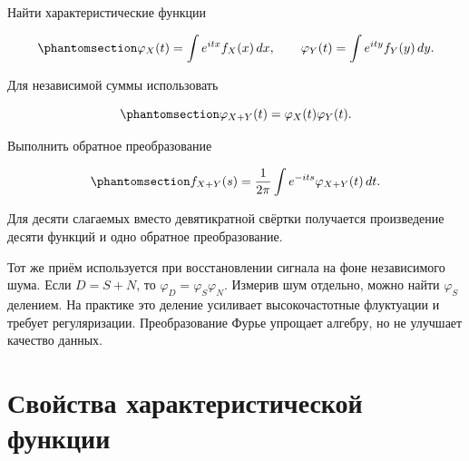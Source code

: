 \documentclass[
  russian,
  11pt,
  a4paper,
  open=any]{scrbook}
\begin{document}
Найти характеристические функции

\begin{equation}\protect\phantomsection\label{eq-sum-fourier-step-forward}{
\varphi_X(t)=\int e^{itx}f_X(x)\,dx,
\qquad
\varphi_Y(t)=\int e^{ity}f_Y(y)\,dy.
}\end{equation}

\par\medskip{}\hspace{0.8em}{\sffamily\bfseries Перемножить}\par\nobreak\smallskip

Для независимой суммы использовать

\begin{equation}\protect\phantomsection\label{eq-sum-fourier-step-product}{
\varphi_{X+Y}(t)=\varphi_X(t)\varphi_Y(t).
}\end{equation}

\par\medskip{}\hspace{0.8em}{\sffamily\bfseries Вернуться к плотности}\par\nobreak\smallskip

Выполнить обратное преобразование

\begin{equation}\protect\phantomsection\label{eq-sum-fourier-step-inverse}{
f_{X+Y}(s)=
\frac{1}{2\pi}\int e^{-its}\varphi_{X+Y}(t)\,dt.
}\end{equation}

\par\medskip

Для десяти слагаемых вместо девятикратной свёртки получается
произведение десяти функций и одно обратное преобразование.

\begin{booknote}

Тот же приём используется при восстановлении сигнала на фоне
независимого шума. Если \(D=S+N\), то \(\varphi_D=\varphi_S\varphi_N\).
Измерив шум отдельно, можно найти \(\varphi_S\) делением. На практике
это деление усиливает высокочастотные флуктуации и требует
регуляризации. Преобразование Фурье упрощает алгебру, но не улучшает
качество данных.

\end{booknote}

\section{Свойства характеристической
функции}\label{ux441ux432ux43eux439ux441ux442ux432ux430-ux445ux430ux440ux430ux43aux442ux435ux440ux438ux441ux442ux438ux447ux435ux441ux43aux43eux439-ux444ux443ux43dux43aux446ux438ux438}
\end{document}
